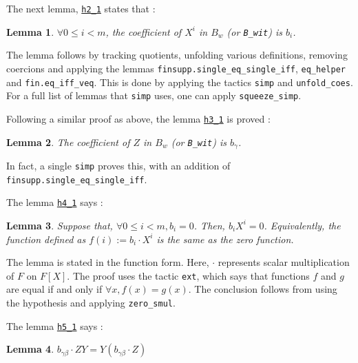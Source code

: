 \documentclass{article}
\newtheorem{lemma}{Lemma}
\theoremstyle{definition}
\theoremstyle{remark}
\begin{document}
The next lemma, \href{https://github.com/BoltonBailey/formal-snarks-project/blob/7fd9cd122f5887f88f6a706b4f2a68a7153c7381/src/snarks/babysnark/knowledge_soundness.lean#L223}{\texttt{h2\_1}} states that :
\theoremstyle{lemma}
\begin{lemma}
    $\forall 0 \le i < m$, the coefficient of $X^{i}$ in $B_{w}$ (or \texttt{B\_wit}) is $b_i$.
\end{lemma}

The lemma follows by tracking quotients, unfolding various definitions, removing coercions and applying the lemmas \texttt{finsupp.single\_eq\_single\_iff}, \texttt{eq\_helper} and \texttt{fin.eq\_iff\_veq}. This is done by applying the tactics 
\texttt{simp} and \texttt{unfold\_coes}. For a full list of lemmas that \texttt{simp} uses, one can apply \texttt{squeeze\_simp}.

Following a similar proof as above, the lemma \href{https://github.com/BoltonBailey/formal-snarks-project/blob/7fd9cd122f5887f88f6a706b4f2a68a7153c7381/src/snarks/babysnark/knowledge_soundness.lean#L244}{\texttt{h3\_1}} is proved : 
\theoremstyle{lemma}
\begin{lemma}
    The coefficient of $Z$ in $B_{w}$ (or \texttt{B\_wit}) is $b_{\gamma}$.
\end{lemma}

In fact, a single \texttt{simp} proves this, with an addition of \texttt{finsupp.single\_eq\_single\_iff}.

The lemma \href{https://github.com/BoltonBailey/formal-snarks-project/blob/7fd9cd122f5887f88f6a706b4f2a68a7153c7381/src/snarks/babysnark/knowledge_soundness.lean#L261}{\texttt{h4\_1}} says :
\theoremstyle{lemma}
\begin{lemma}
    Suppose that, $\forall 0 \le i < m, b_{i} = 0$. Then, $b_i X^i = 0$. Equivalently, the function defined as $f(i) := b_i \cdot X^i$ is the same as the zero function.
\end{lemma}

The lemma is stated in the function form. Here, $\cdot$ represents scalar multiplication of $F$ on $F[X]$.
The proof uses the tactic \texttt{ext}, which says that functions $f$ and $g$ are equal if and only if $\forall x, f(x) = g(x)$. The conclusion follows from 
using the hypothesis and applying \texttt{zero\_smul}.

The lemma \href{https://github.com/BoltonBailey/formal-snarks-project/blob/7fd9cd122f5887f88f6a706b4f2a68a7153c7381/src/snarks/babysnark/knowledge_soundness.lean#L272}{\texttt{h5\_1}} says :
\theoremstyle{lemma}
\begin{lemma}
    $b_{\gamma \beta} \cdot ZY = Y (b_{\gamma \beta} \cdot Z)$
\end{lemma}
\end{document}
